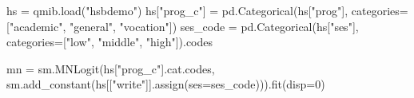 \documentclass[
  letterpaper,
  10pt,
  twoside,
  openright,
  numbers=noenddot,
  chapterprefix=true]{scrbook}
\newenvironment{Shaded}{}{}
\newcommand{\DecValTok}[1]{\textcolor[rgb]{0.00,0.36,0.77}{#1}}
\newcommand{\NormalTok}[1]{\textcolor[rgb]{0.14,0.16,0.18}{#1}}
\newcommand{\OperatorTok}[1]{\textcolor[rgb]{0.14,0.16,0.18}{#1}}
\newcommand{\StringTok}[1]{\textcolor[rgb]{0.01,0.18,0.38}{#1}}
\begin{document}
\label{check-multinomial}
\begin{Shaded}
\begin{Highlighting}[]
\NormalTok{hs }\OperatorTok{=}\NormalTok{ qmib.load(}\StringTok{"hsbdemo"}\NormalTok{)}
\NormalTok{hs[}\StringTok{"prog\_c"}\NormalTok{] }\OperatorTok{=}\NormalTok{ pd.Categorical(hs[}\StringTok{"prog"}\NormalTok{], categories}\OperatorTok{=}\NormalTok{[}\StringTok{"academic"}\NormalTok{, }\StringTok{"general"}\NormalTok{, }\StringTok{"vocation"}\NormalTok{])}
\NormalTok{ses\_code }\OperatorTok{=}\NormalTok{ pd.Categorical(hs[}\StringTok{"ses"}\NormalTok{], categories}\OperatorTok{=}\NormalTok{[}\StringTok{"low"}\NormalTok{, }\StringTok{"middle"}\NormalTok{, }\StringTok{"high"}\NormalTok{]).codes}

\NormalTok{mn }\OperatorTok{=}\NormalTok{ sm.MNLogit(hs[}\StringTok{"prog\_c"}\NormalTok{].cat.codes,}
\NormalTok{                sm.add\_constant(hs[[}\StringTok{"write"}\NormalTok{]].assign(ses}\OperatorTok{=}\NormalTok{ses\_code))).fit(disp}\OperatorTok{=}\DecValTok{0}\NormalTok{)}


\end{Highlighting}
\end{Shaded}
\end{document}
